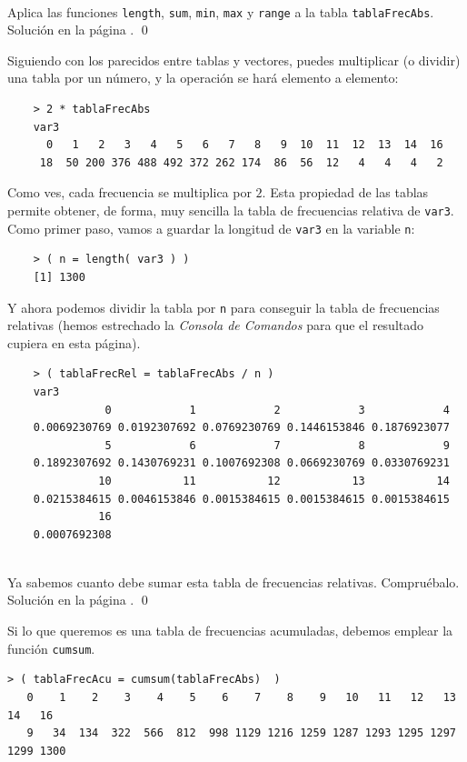 \documentclass[10pt,a4paper]{article}\usepackage[]{graphicx}\usepackage[]{color}
\begin{document}
\begin{ejercicio}
\label{tut02:ejercicio11}
\quad\\
Aplica las funciones {\tt length}, {\tt sum}, {\tt min}, {\tt max} y {\tt range} a la tabla {\tt tablaFrecAbs}. Solución en la página \pageref{tut02:ejercicio11:sol}.
\qed
\end{ejercicio}
Siguiendo con los parecidos entre tablas y vectores, puedes multiplicar (o dividir) una tabla por un número, y la operación se hará elemento a elemento:
    \begin{verbatim}
    > 2 * tablaFrecAbs
    var3
      0   1   2   3   4   5   6   7   8   9  10  11  12  13  14  16
     18  50 200 376 488 492 372 262 174  86  56  12   4   4   4   2
    \end{verbatim}
Como ves, cada frecuencia se multiplica por $2$. Esta propiedad de las tablas permite obtener, de forma, muy sencilla la tabla de frecuencias relativa de {\tt var3}. Como primer paso, vamos a guardar la longitud de {\tt var3} en la variable {\tt n}:
    \begin{verbatim}
    > ( n = length( var3 ) )
    [1] 1300
    \end{verbatim}
Y ahora podemos dividir la tabla por {\tt n} para conseguir la tabla de frecuencias relativas (hemos estrechado la {\em Consola de Comandos} para que el resultado cupiera en esta página).
    \begin{verbatim}
    > ( tablaFrecRel = tablaFrecAbs / n )
    var3
               0            1            2            3            4
    0.0069230769 0.0192307692 0.0769230769 0.1446153846 0.1876923077
               5            6            7            8            9
    0.1892307692 0.1430769231 0.1007692308 0.0669230769 0.0330769231
              10           11           12           13           14
    0.0215384615 0.0046153846 0.0015384615 0.0015384615 0.0015384615
              16
    0.0007692308
    \end{verbatim}
\begin{ejercicio}
\label{tut02:ejercicio12}
\quad\\
Ya sabemos cuanto debe sumar esta tabla de frecuencias relativas. Compruébalo. Solución en la página \pageref{tut02:ejercicio12:sol}.
\qed
\end{ejercicio}

Si lo que queremos es una tabla de frecuencias acumuladas, debemos emplear la función {\tt cumsum}.

\begin{verbatim}
> ( tablaFrecAcu = cumsum(tablaFrecAbs)  )
   0    1    2    3    4    5    6    7    8    9   10   11   12   13   14   16
   9   34  134  322  566  812  998 1129 1216 1259 1287 1293 1295 1297 1299 1300
\end{verbatim}
\end{document}

